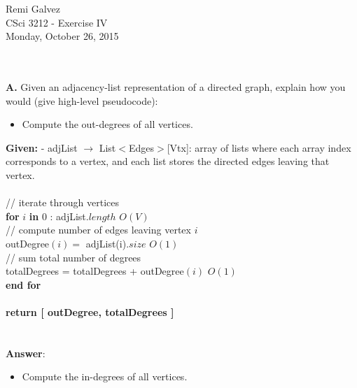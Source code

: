 \documentclass{article}
\begin{document}
	\begin{flushright}
		Remi Galvez\\
		CSci 3212 - Exercise IV\\
		Monday, October 26, 2015
	\end{flushright}
	
	\noindent \\
	\\
	\textbf{A.} Given an adjacency-list representation of a directed graph, explain how you would (give high-level pseudocode):\\

	\begin{itemize}
		\item Compute the out-degrees of all vertices.
	\end{itemize}
	
	\noindent \textbf{Given:} - adjList $\rightarrow$ List$<$Edges$>$[Vtx]: array of lists where each array index corresponds to a vertex, and each list stores the directed edges leaving that vertex.\\
	\\
	// iterate through vertices \\
	\textbf{for} $i$ \textbf{in} $0$ : adjList.$length$ \qquad \qquad \qquad \qquad \qquad \qquad \qquad \quad $O(V)$ \\
	\indent // compute number of edges leaving vertex $i$ \\
	\indent outDegree$(i) =$ adjList(i).$size$ \qquad \qquad \qquad \qquad \qquad \qquad $O(1)$ \\
	\indent // sum total number of degrees \\
	\indent totalDegrees = totalDegrees + outDegree$(i)$ \qquad \qquad \qquad $O(1)$ \\
	\textbf{end for} \\
	\\
	\textbf{return [ outDegree, totalDegrees ]} \\
	 \\
	 \\
	\textbf{Answer}:  \\
	
	\begin{itemize}
		\item Compute the in-degrees of all vertices. \\
	\end{itemize}
	
\end{document}
